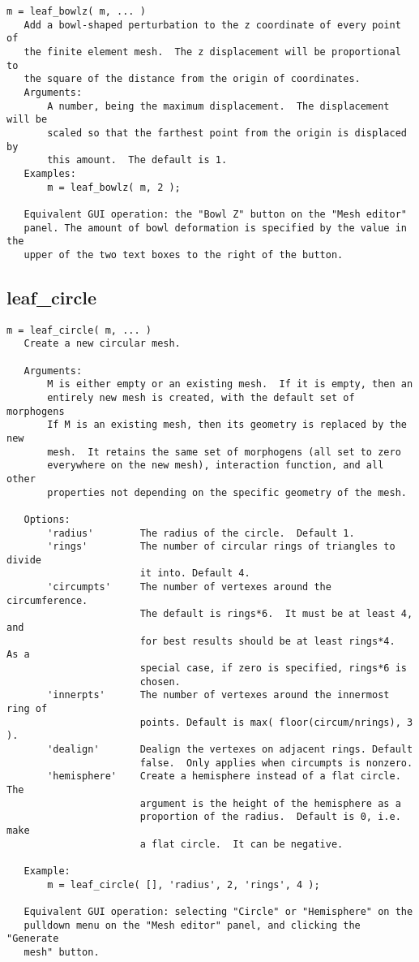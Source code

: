 \begin{verbatim}
m = leaf_bowlz( m, ... )
   Add a bowl-shaped perturbation to the z coordinate of every point of
   the finite element mesh.  The z displacement will be proportional to
   the square of the distance from the origin of coordinates.
   Arguments:
       A number, being the maximum displacement.  The displacement will be
       scaled so that the farthest point from the origin is displaced by
       this amount.  The default is 1.
   Examples:
       m = leaf_bowlz( m, 2 );

   Equivalent GUI operation: the "Bowl Z" button on the "Mesh editor"
   panel. The amount of bowl deformation is specified by the value in the
   upper of the two text boxes to the right of the button.
\end{verbatim}

\subsection{leaf\_circle}\label{section-leaf-circle}

\begin{verbatim}
m = leaf_circle( m, ... )
   Create a new circular mesh.

   Arguments:
       M is either empty or an existing mesh.  If it is empty, then an
       entirely new mesh is created, with the default set of morphogens
       If M is an existing mesh, then its geometry is replaced by the new
       mesh.  It retains the same set of morphogens (all set to zero
       everywhere on the new mesh), interaction function, and all other
       properties not depending on the specific geometry of the mesh.

   Options:
       'radius'        The radius of the circle.  Default 1.
       'rings'         The number of circular rings of triangles to divide
                       it into. Default 4.
       'circumpts'     The number of vertexes around the circumference.
                       The default is rings*6.  It must be at least 4, and
                       for best results should be at least rings*4.  As a
                       special case, if zero is specified, rings*6 is
                       chosen.
       'innerpts'      The number of vertexes around the innermost ring of
                       points. Default is max( floor(circum/nrings), 3 ).
       'dealign'       Dealign the vertexes on adjacent rings. Default
                       false.  Only applies when circumpts is nonzero.
       'hemisphere'    Create a hemisphere instead of a flat circle.  The
                       argument is the height of the hemisphere as a
                       proportion of the radius.  Default is 0, i.e. make
                       a flat circle.  It can be negative.

   Example:
       m = leaf_circle( [], 'radius', 2, 'rings', 4 );

   Equivalent GUI operation: selecting "Circle" or "Hemisphere" on the
   pulldown menu on the "Mesh editor" panel, and clicking the "Generate
   mesh" button.
\end{verbatim}

